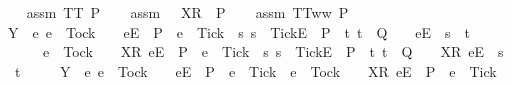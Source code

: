 \begin{isabellebody}
\ \ \isamarkupfalse%
\ assm{}{\isacharcolon}\ {\isachardoublequoteopen}TT\ P{\isachardoublequoteclose}\isanewline
\ \ \isamarkupfalse%
\ assm{}{\isacharcolon}\ {\isachardoublequoteopen}{\isasymrho}\ {\isacharat}\ {\isacharbrackleft}{\isacharbrackleft}X{\isacharbrackright}\isactrlsub R{\isacharbrackright}\ {\isasymin}\ P{\isachardoublequoteclose}\isanewline
\ \ \isamarkupfalse%
\ assm{}{\isacharcolon}\ {\isachardoublequoteopen}TT{}ww\ P{\isachardoublequoteclose}\isanewline
\ \ \isamarkupfalse%
\ {\isachardoublequoteopen}Y\ {\isasyminter}\ {\isacharbraceleft}e{\isachardot}\ e\ {\isasymnoteq}\ Tock\ {\isasymand}\ {\isacharparenleft}{\isasymrho}\ {\isacharat}\ {\isacharbrackleft}{\isacharbrackleft}e{\isacharbrackright}\isactrlsub E{\isacharbrackright}\ {\isasymin}\ P\ {\isasymand}\ e\ {\isasymnoteq}\ Tick\ {\isasymor}\ {\isacharparenleft}{\isasymexists}s{\isachardot}\ s\ {\isacharat}\ {\isacharbrackleft}{\isacharbrackleft}Tick{\isacharbrackright}\isactrlsub E{\isacharbrackright}\ {\isasymin}\ P\ {\isasymand}\ {\isacharparenleft}{\isasymexists}t{\isachardot}\ t\ {\isasymin}\ Q\ {\isasymand}\ {\isasymrho}\ {\isacharat}\ {\isacharbrackleft}{\isacharbrackleft}e{\isacharbrackright}\isactrlsub E{\isacharbrackright}\ {\isacharequal}\ s\ {\isacharat}\ t{\isacharparenright}{\isacharparenright}{\isacharparenright}\ {\isasymor}\isanewline
\ \ \ \ \ \ e\ {\isacharequal}\ Tock\ {\isasymand}\ {\isacharparenleft}{\isasymrho}\ {\isacharat}\ {\isacharbrackleft}{\isacharbrackleft}X{\isacharbrackright}\isactrlsub R{\isacharcomma}\ {\isacharbrackleft}e{\isacharbrackright}\isactrlsub E{\isacharbrackright}\ {\isasymin}\ P\ {\isasymand}\ e\ {\isasymnoteq}\ Tick\ {\isasymor}\ {\isacharparenleft}{\isasymexists}s{\isachardot}\ s\ {\isacharat}\ {\isacharbrackleft}{\isacharbrackleft}Tick{\isacharbrackright}\isactrlsub E{\isacharbrackright}\ {\isasymin}\ P\ {\isasymand}\ {\isacharparenleft}{\isasymexists}t{\isachardot}\ t\ {\isasymin}\ Q\ {\isasymand}\ {\isasymrho}\ {\isacharat}\ {\isacharbrackleft}{\isacharbrackleft}X{\isacharbrackright}\isactrlsub R{\isacharcomma}\ {\isacharbrackleft}e{\isacharbrackright}\isactrlsub E{\isacharbrackright}\ {\isacharequal}\ s\ {\isacharat}\ t{\isacharparenright}{\isacharparenright}{\isacharparenright}{\isacharbraceright}\isanewline
\ \ \ \ {\isacharequal}\ Y\ {\isasyminter}\ {\isacharparenleft}{\isacharbraceleft}e{\isachardot}\ e\ {\isasymnoteq}\ Tock\ {\isasymand}\ {\isasymrho}\ {\isacharat}\ {\isacharbrackleft}{\isacharbrackleft}e{\isacharbrackright}\isactrlsub E{\isacharbrackright}\ {\isasymin}\ P\ {\isasymand}\ e\ {\isasymnoteq}\ Tick\ {\isasymor}\ e\ {\isacharequal}\ Tock\ {\isasymand}\ {\isasymrho}\ {\isacharat}\ {\isacharbrackleft}{\isacharbrackleft}X{\isacharbrackright}\isactrlsub R{\isacharcomma}\ {\isacharbrackleft}e{\isacharbrackright}\isactrlsub E{\isacharbrackright}\ {\isasymin}\ P\ {\isasymand}\ e\ {\isasymnoteq}\ Tick{\isacharbraceright}\isanewline

\end{isabellebody}
